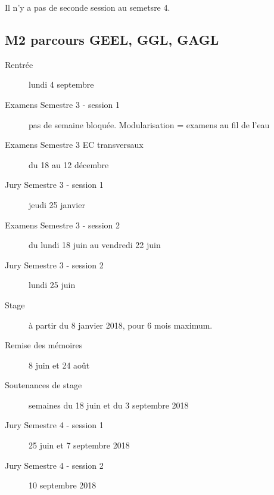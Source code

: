 \documentclass[a4paper,11pt]{article}
\begin{document}
Il n'y a pas de seconde session au semetsre 4.

\subsection{M2 parcours GEEL, GGL, GAGL}

\begin{description}
	\item[Rentrée] lundi 4 septembre
	\item[Examens Semestre 3 - session 1] pas de semaine bloquée. Modularisation = examens au fil de l'eau
	\item[Examens Semestre 3 EC transversaux] du 18 au 12 décembre
	\item[Jury Semestre 3 - session 1] jeudi 25 janvier
	\item[Examens Semestre 3 - session 2] du lundi 18 juin au vendredi 22 juin
	\item[Jury Semestre 3 - session 2] lundi 25 juin
	\item[Stage] à partir du 8 janvier 2018, pour 6 mois maximum.
	\item[Remise des mémoires] 8 juin et 24 août
	\item[Soutenances de stage] semaines du 18 juin et du 3 septembre 2018
	\item[Jury Semestre 4 - session 1] 25 juin et 7 septembre 2018
	\item[Jury Semestre 4 - session 2] 10 septembre 2018
\end{description}	
\end{document}
